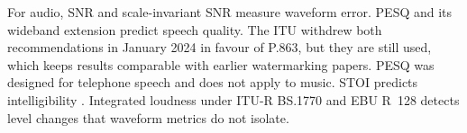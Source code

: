 For audio, SNR and scale-invariant SNR \cite{leroux2019sdr} measure waveform error. PESQ \cite{rix2001pesq,itu2001p862} and its wideband extension \cite{itu2007p8622} predict speech quality. The ITU withdrew both recommendations in January 2024 in favour of P.863, but they are still used, which keeps results comparable with earlier watermarking papers. PESQ was designed for telephone speech and does not apply to music. STOI predicts intelligibility \cite{taal2011stoi}. Integrated loudness under ITU-R BS.1770 \cite{itu2023bs1770} and EBU R~128 \cite{ebu2023r128} detects level changes that waveform metrics do not isolate.
